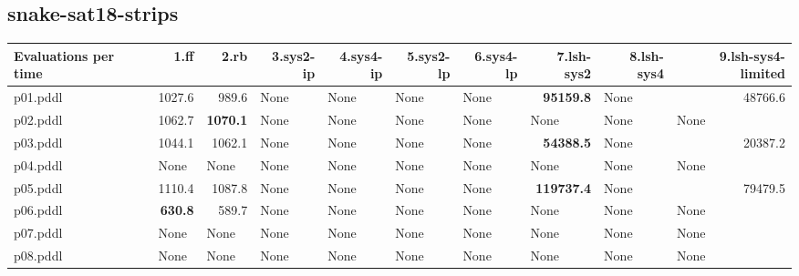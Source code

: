 \documentclass{article}
\begin{document}
\hypertarget{evaluations_per_time-snake-sat18-strips}{}
\subsection*{snake-sat18-strips}

\begin{tabular}{@{}lrrrrrrrrr@{}}
Evaluations per time & 1.ff & 2.rb & 3.sys2-ip & 4.sys4-ip & 5.sys2-lp & 6.sys4-lp & 7.lsh-sys2 & 8.lsh-sys4 & 9.lsh-sys4-limited \\
\midrule
p01.pddl & 1027.6 & 989.6 & \multicolumn{1}{|l|}{None} & \multicolumn{1}{|l|}{None} & \multicolumn{1}{|l|}{None} & \multicolumn{1}{|l|}{None} & \textbf{95159.8} & \multicolumn{1}{|l|}{None} & 48766.6 \\
p02.pddl & 1062.7 & \textbf{1070.1} & \multicolumn{1}{|l|}{None} & \multicolumn{1}{|l|}{None} & \multicolumn{1}{|l|}{None} & \multicolumn{1}{|l|}{None} & \multicolumn{1}{|l|}{None} & \multicolumn{1}{|l|}{None} & \multicolumn{1}{|l|}{None} \\
p03.pddl & 1044.1 & 1062.1 & \multicolumn{1}{|l|}{None} & \multicolumn{1}{|l|}{None} & \multicolumn{1}{|l|}{None} & \multicolumn{1}{|l|}{None} & \textbf{54388.5} & \multicolumn{1}{|l|}{None} & 20387.2 \\
p04.pddl & \multicolumn{1}{|l|}{None} & \multicolumn{1}{|l|}{None} & \multicolumn{1}{|l|}{None} & \multicolumn{1}{|l|}{None} & \multicolumn{1}{|l|}{None} & \multicolumn{1}{|l|}{None} & \multicolumn{1}{|l|}{None} & \multicolumn{1}{|l|}{None} & \multicolumn{1}{|l|}{None} \\
p05.pddl & 1110.4 & 1087.8 & \multicolumn{1}{|l|}{None} & \multicolumn{1}{|l|}{None} & \multicolumn{1}{|l|}{None} & \multicolumn{1}{|l|}{None} & \textbf{119737.4} & \multicolumn{1}{|l|}{None} & 79479.5 \\
p06.pddl & \textbf{630.8} & 589.7 & \multicolumn{1}{|l|}{None} & \multicolumn{1}{|l|}{None} & \multicolumn{1}{|l|}{None} & \multicolumn{1}{|l|}{None} & \multicolumn{1}{|l|}{None} & \multicolumn{1}{|l|}{None} & \multicolumn{1}{|l|}{None} \\
p07.pddl & \multicolumn{1}{|l|}{None} & \multicolumn{1}{|l|}{None} & \multicolumn{1}{|l|}{None} & \multicolumn{1}{|l|}{None} & \multicolumn{1}{|l|}{None} & \multicolumn{1}{|l|}{None} & \multicolumn{1}{|l|}{None} & \multicolumn{1}{|l|}{None} & \multicolumn{1}{|l|}{None} \\
p08.pddl & \multicolumn{1}{|l|}{None} & \multicolumn{1}{|l|}{None} & \multicolumn{1}{|l|}{None} & \multicolumn{1}{|l|}{None} & \multicolumn{1}{|l|}{None} & \multicolumn{1}{|l|}{None} & \multicolumn{1}{|l|}{None} & \multicolumn{1}{|l|}{None} & \multicolumn{1}{|l|}{None} \\

\end{tabular}
\end{document}
